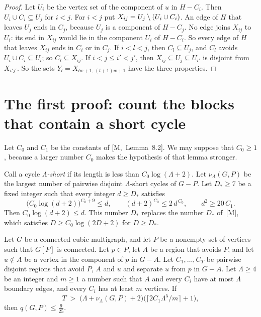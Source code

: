 \documentclass[11pt]{article}
\newcommand{\M}[1]{[M,~#1]}
\begin{document}
\begin{proof}
Let $U_i$ be the vertex set of the component of $u$ in $H-C_i$. Then $U_i\cup C_i\subseteq U_j$
for $i<j$. For $i<j$ put $X_{ij}=U_j\setminus(U_i\cup C_i)$. An edge of $H$ that leaves $U_j$ ends
in $C_j$, because $U_j$ is a component of $H-C_j$. No edge joins $X_{ij}$ to $U_i$: its end in
$X_{ij}$ would lie in the component $U_i$ of $H-C_i$. So every edge of $H$ that leaves $X_{ij}$
ends in $C_i$ or in $C_j$. If $i<l<j$, then $C_l\subseteq U_j$, and $C_l$ avoids
$U_i\cup C_i\subseteq U_l$; so $C_l\subseteq X_{ij}$. If $i<j\le i'<j'$, then
$X_{ij}\subseteq U_j\subseteq U_{i'}$ is disjoint from $X_{i'j'}$. So the sets
$Y_l=X_{lw+1,\,(l+1)w+1}$ have the three properties.
\end{proof}

\section{The first proof: count the blocks that contain a short cycle}\label{sec:first}

Let $C_0$ and $C_1$ be the constants of \M{Lemma~8.2}. We may suppose that $C_0\ge1$, because a
larger number $C_0$ makes the hypothesis of that lemma stronger.

Call a cycle \emph{$\Lambda$-short} if its length is less than $C_0\log(\Lambda+2)$. Let
$\nu_\Lambda(G,P)$ be the largest number of pairwise disjoint $\Lambda$-short cycles of $G-P$. Let
$D_*\ge7$ be a fixed integer such that every integer $d\ge D_*$ satisfies
\begin{equation}\label{eq:dstar}
  \bigl(C_0\log(d+2)\bigr)^{C_0+9}\le d,\qquad (d+2)^{C_0}\le2\,d^{\,C_0},\qquad d^{2}\ge20\,C_1 .
\end{equation}
Then $C_0\log(d+2)\le d$. This number $D_*$ replaces the number $D_*$ of~[M], which satisfies
$D\ge C_0\log(2D+2)$ for $D\ge D_*$.

\begin{proposition}\label{prop:chain}
Let $G$ be a connected cubic multigraph, and let $P$ be a nonempty set of vertices such that
$G[P]$ is connected. Let $p\in P$, let $A$ be a region that avoids $P$, and let $u\notin A$ be a
vertex in the component of $p$ in $G-A$. Let $C_1,\dots,C_T$ be pairwise disjoint regions that
avoid $P$, $A$ and $u$ and separate $u$ from $p$ in $G-A$. Let $\Lambda\ge4$ be an integer and
$m\ge1$ a number such that $A$ and every $C_i$ have at most $\Lambda$ boundary edges, and every
$C_i$ has at least $m$ vertices. If
\[
  T\;>\;\bigl(\Lambda+\nu_\Lambda(G,P)+2\bigr)\bigl(\lceil2C_1\Lambda^{5}/m\rceil+1\bigr),
\]
then $q(G,P)\le\frac9{25}$.
\end{proposition}
\end{document}
